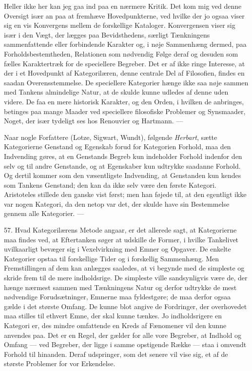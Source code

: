 \documentclass[12pt,a4paper]{book}
\newcommand{\opage}[1]{\marginnote{\footnotesize\textit{[#1]}}}
\newcommand{\apage}[1]{\marginnote{\footnotesize\textit{[#1]}}}
\begin{document}
Heller ikke her kan jeg gaa ind paa en nærmere Kritik. Det kom mig ved denne
Oversigt især an paa at fremhæve Hovedpunkterne, ved hvilke der jo ogsaa
viser sig en vis \apage{153} Konvergens mellem de forskellige Kataloger. Konvergensen
viser sig især i den Vægt, der lægges paa Bevidsthedens, særligt
Tænkningens sammenfattende eller forbindende Karakter og, i nøje
Sammenhæng dermed, paa Forholdsbestemtheden, Relationen som nødvendig Følge
deraf og desuden som fælles Karaktertræk for de speciellere Begreber. Det
er af ikke ringe Interesse, at der i et Hovedpunkt af Kategorilæren, denne
centrale Del af Filosofien, findes en saadan Overensstemmelse. De speciellere
Kategorier hænge ikke saa nøje sammen med Tankens almindelige Natur, at de
skulde kunne udledes af denne uden videre. De faa en mere historisk
Karakter, og den Orden, i hvilken de anbringes, betinges paa mange Maader
ved speciellere filosofiske Problemer og Synsmaader, Noget, der især
tydeligt ses hos Renouvier og Hartmann. ---

Naar nogle Forfattere (Lotze, Sigwart, Wundt), følgende \emph{Herbart},
sætte Kategorierne Genstand og Egenskab forud for Kategorien Forhold, maa
den Indvending gøres, at en Genstands Begreb kun indeholder Forhold indenfor
den selv og til andre Genstande, og at Egenskaber kun udtrykke saadanne
Forhold. Og dertil kommer som den væsentligste Indvending, at Genstanden
kun kendes som Tankens Genstand; den kan da ikke selv være den første
Kategori. Aristoteles stillede den ganske vist først; men han føjede til,
at den egentligt ikke var nogen Kategori, da den netop var det, der skulde
have sin Bestemmelse gennem alle Kategorier. ---

57. Hvad Kategorilærens Metode angaar, er det allerede sagt, at Kategorierne
maa findes ved, at Eftertanken søger at udskille de Former, i hvilke
Tankelivet uvilkaarligt bevæger sig i Vexelvirkning med Emner og Opgaver. De
enkelte Kategorier opstaa til forskellige Tider og i forskellig Sammenhæng.
Men Fremstillingen af dem kan anlægges saaledes, at vi begynde med de
simpleste og skride frem til de mere indholdsrige. De simpleste ville
sandsynligvis være de, der hænge nærmest sammen med Tænkningens Natur og
derfor udtrykke de mest nødvendige Forudsætninger, Emnerne
\opage{154}maa
fyldestgøre; de maa derfor ogsaa gælde i det største Omfang. De kunne blot
angive de Fordringer, der overhovedet maa stilles til ethvert Emne, der skal
kunne tænkes. Jo indholdsrigere en Kategori er, des mindre omfattende en
Kreds af Fænomener vil den kunne anvendes paa. Det er en Regel, der gælder
for alle vore Begreber, at Indhold og Omfang --- ved Begreber, der ligge i
samme opstigende Række --- staa i omvendt Forhold til hinanden. Deraf
udspringer, som det senere vil vise sig, et af de største Problemer for vor
Erkendelse.
\end{document}
